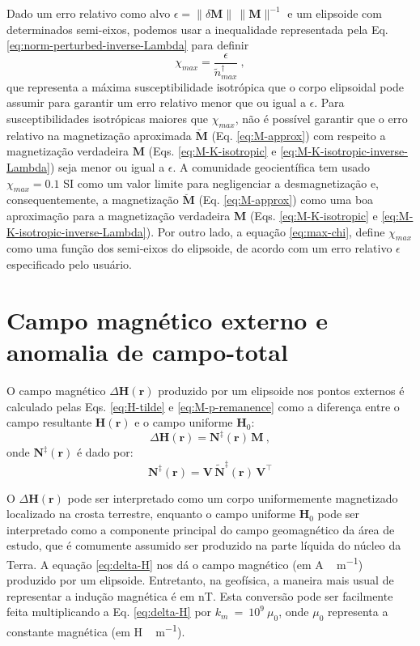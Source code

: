 Dado um erro relativo como alvo
$\epsilon = \| \delta \mathbf{M} \| \, \| \mathbf{M} \|^{-1}$
e um elipsoide com determinados semi-eixos, podemos usar a inequalidade representada pela 
Eq. \ref{eq:norm-perturbed-inverse-Lambda}
para definir
\begin{equation}
\chi_{max} = \frac{\epsilon}{\tilde{n}^{\dagger}_{max}} \: ,
\label{eq:max-chi}
\end{equation}
que representa a máxima susceptibilidade isotrópica que o corpo elipsoidal
pode assumir para garantir um erro relativo menor que ou igual a $\epsilon$.
Para susceptibilidades isotrópicas maiores que $\chi_{max}$,
não é possível garantir que o erro relativo na magnetização aproximada
$\breve{\mathbf{M}}$ (Eq. \ref{eq:M-approx}) com respeito a magnetização verdadeira
$\mathbf{M}$ (Eqs. \ref{eq:M-K-isotropic} e \ref{eq:M-K-isotropic-inverse-Lambda})
seja menor ou igual a $\epsilon$. A comunidade geocientífica tem usado $\chi_{max} = 0.1$ SI
como um valor limite para negligenciar a desmagnetização e, consequentemente, a magnetização
$\breve{\mathbf{M}}$ (Eq. \ref{eq:M-approx}) como uma boa aproximação para a magnetização
verdadeira $\mathbf{M}$ (Eqs. \ref{eq:M-K-isotropic} e \ref{eq:M-K-isotropic-inverse-Lambda}).
Por outro lado, a equação \ref{eq:max-chi}, define $\chi_{max}$ como uma função dos semi-eixos do elipsoide,
de acordo com um erro relativo $\epsilon$ especificado pelo usuário.

\section{Campo magnético externo e anomalia de campo-total}

O campo magnético $\Delta {\mathbf{H}}({\mathbf{r}})$ produzido por um elipsoide nos pontos externos é calculado pelas Eqs. \ref{eq:H-tilde} e \ref{eq:M-p-remanence} como a diferença entre o campo resultante ${\mathbf{H}}({\mathbf{r}})$ 
e o campo uniforme ${\mathbf{H}}_{0}$:
\begin{equation}
\Delta {\mathbf{H}}({\mathbf{r}}) = 
{\mathbf{N}}^{\ddagger}({\mathbf{r}}) \, {\mathbf{M}} \: ,
\label{eq:delta-H}
\end{equation}
onde ${\mathbf{N}}^{\ddagger}({\mathbf{r}})$ é dado por:
\begin{equation}
{\mathbf{N}}^{\ddagger}({\mathbf{r}}) = 
\mathbf{V} \, \tilde{{\mathbf{N}}}^{\ddagger}({\mathbf{r}}) \, \mathbf{V}^{\top}
\label{eq:n-p}
\end{equation}

O $\Delta {\mathbf{H}}({\mathbf{r}})$ pode ser interpretado como um corpo uniformemente magnetizado localizado na crosta terrestre, enquanto o campo uniforme ${\mathbf{H}}_{0}$ pode ser interpretado como a componente principal do campo geomagnético da área de estudo, que é comumente assumido ser produzido na parte líquida do núcleo da Terra. A equação \ref{eq:delta-H} nos dá o campo magnético (em \unit{A \, m^{-1}}) produzido por um elipsoide. Entretanto, na geofísica, a maneira mais usual de representar a indução magnética é  em  \unit{nT}. Esta conversão pode ser facilmente feita multiplicando a Eq. \ref{eq:delta-H} por $k_{m}~=~10^{9}~\mu_{0}$, onde $\mu_{0}$ representa a constante magnética (em \unit{H \, m^{-1}}).


